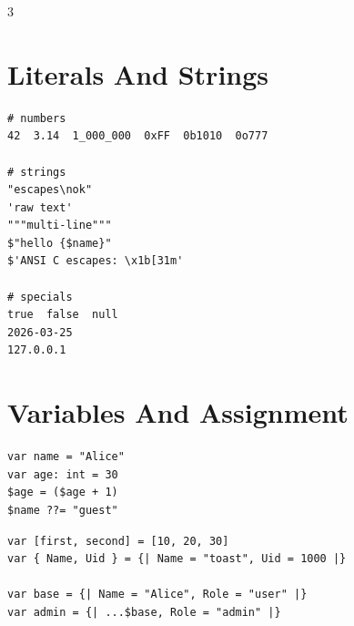 


\footnotesize
{}

\begin{multicols*}{3}

\section{Literals And Strings}
\begin{lstlisting}
# numbers
42  3.14  1_000_000  0xFF  0b1010  0o777

# strings
"escapes\nok"
'raw text'
"""multi-line"""
$"hello {$name}"
$'ANSI C escapes: \x1b[31m'

# specials
true  false  null
2026-03-25
127.0.0.1
\end{lstlisting}


\section{Variables And Assignment}
\begin{lstlisting}
var name = "Alice"
var age: int = 30
$age = ($age + 1)
$name ??= "guest"
\end{lstlisting}

\begin{lstlisting}
var [first, second] = [10, 20, 30]
var { Name, Uid } = {| Name = "toast", Uid = 1000 |}

var base = {| Name = "Alice", Role = "user" |}
var admin = {| ...$base, Role = "admin" |}
\end{lstlisting}



\end{multicols*}
